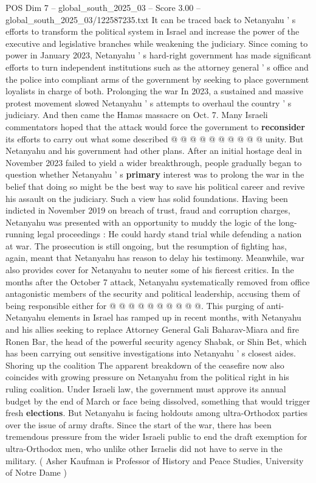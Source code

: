 \begin{textsample}{POS Dim 7 – global\_south\_2025\_03 – Score 3.00 – global\_south\_2025\_03/122587235.txt}
It can be traced back to Netanyahu ' s efforts to transform the political system in Israel and increase the power of the executive and legislative branches while weakening the judiciary.
Since coming to power in January 2023, Netanyahu ' s hard-right government has made significant efforts to turn independent institutions such as the attorney general ' s office and the police into compliant arms of the government by seeking to place government loyalists in charge of both.
Prolonging the war In 2023, a sustained and massive protest movement slowed Netanyahu ' s attempts to overhaul the country ' s judiciary.
And then came the Hamas massacre on Oct. 7.
Many Israeli commentators hoped that the attack would force the government to \textbf{reconsider} its efforts to carry out what some described @ @ @ @ @ @ @ @ @ @ unity.
But Netanyahu and his government had other plans.
After an initial hostage deal in November 2023 failed to yield a wider breakthrough, people gradually began to question whether Netanyahu ' s \textbf{primary} interest was to prolong the war in the belief that doing so might be the best way to save his political career and revive his assault on the judiciary.
Such a view has solid foundations.
Having been indicted in November 2019 on breach of trust, fraud and corruption charges, Netanyahu was presented with an opportunity to muddy the logic of the long-running legal proceedings : He could hardy stand trial while defending a nation at war.
The prosecution is still ongoing, but the resumption of fighting has, again, meant that Netanyahu has reason to delay his testimony.
Meanwhile, war also provides cover for Netanyahu to neuter some of his fiercest critics.
In the months after the October 7 attack, Netanyahu systematically removed from office antagonistic members of the security and political leadership, accusing them of being responsible either for @ @ @ @ @ @ @ @ @ @.
This purging of anti-Netanyahu elements in Israel has ramped up in recent months, with Netanyahu and his allies seeking to replace Attorney General Gali Baharav-Miara and fire Ronen Bar, the head of the powerful security agency Shabak, or Shin Bet, which has been carrying out sensitive investigations into Netanyahu ' s closest aides.
Shoring up the coalition The apparent breakdown of the ceasefire now also coincides with growing pressure on Netanyahu from the political right in his ruling coalition.
Under Israeli law, the government must approve its annual budget by the end of March or face being dissolved, something that would trigger fresh \textbf{elections}.
But Netanyahu is facing holdouts among ultra-Orthodox parties over the issue of army drafts.
Since the start of the war, there has been tremendous pressure from the wider Israeli public to end the draft exemption for ultra-Orthodox men, who unlike other Israelis did not have to serve in the military. ( Asher Kaufman is Professor of History and Peace Studies, University of Notre Dame )

\end{textsample}
